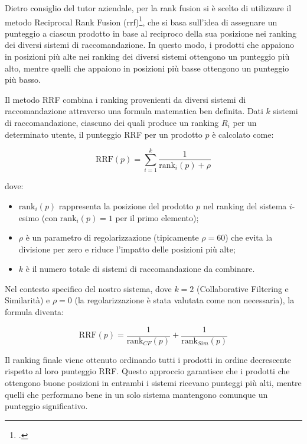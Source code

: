 Dietro consiglio del tutor aziendale, per la rank fusion si è scelto di utilizzare il metodo Reciprocal Rank Fusion (\gls{rrf})\footcite{site:rrf-explained}, che si basa sull'idea di assegnare un punteggio a ciascun prodotto in base al reciproco della sua posizione nei ranking dei diversi sistemi di raccomandazione. In questo modo, i prodotti che appaiono in posizioni più alte nei ranking dei diversi sistemi ottengono un punteggio più alto, mentre quelli che appaiono in posizioni più basse ottengono un punteggio più basso.

Il metodo RRF combina i ranking provenienti da diversi sistemi di raccomandazione attraverso una formula matematica ben definita. Dati $k$ sistemi di raccomandazione, ciascuno dei quali produce un ranking $R_i$ per un determinato utente, il punteggio RRF per un prodotto $p$ è calcolato come:

\begin{equation}
\text{RRF}(p) = \sum_{i=1}^{k} \frac{1}{\text{rank}_i(p) + \rho}
\end{equation}

dove:
\begin{itemize}
    \item $\text{rank}_i(p)$ rappresenta la posizione del prodotto $p$ nel ranking del sistema $i$-esimo (con $\text{rank}_i(p) = 1$ per il primo elemento);
    \item $\rho$ è un parametro di regolarizzazione (tipicamente $\rho = 60$) che evita la divisione per zero e riduce l'impatto delle posizioni più alte;
    \item $k$ è il numero totale di sistemi di raccomandazione da combinare.
\end{itemize}

Nel contesto specifico del nostro sistema, dove $k = 2$ (Collaborative Filtering e Similarità) e $\rho = 0$ (la regolarizzazione è stata valutata come non necessaria), la formula diventa:

\begin{equation}
\text{RRF}(p) = \frac{1}{\text{rank}_{CF}(p)} + \frac{1}{\text{rank}_{Sim}(p)}
\end{equation}

Il ranking finale viene ottenuto ordinando tutti i prodotti in ordine decrescente rispetto al loro punteggio RRF. Questo approccio garantisce che i prodotti che ottengono buone posizioni in entrambi i sistemi ricevano punteggi più alti, mentre quelli che performano bene in un solo sistema mantengono comunque un punteggio significativo.

